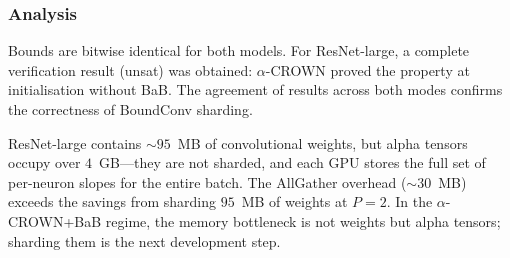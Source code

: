 \subsubsection{Analysis}

Bounds are bitwise identical for both models. For ResNet-large, a complete
verification result (unsat) was obtained: $\alpha$-CROWN proved the property
at initialisation without BaB. The agreement of results across both modes
confirms the correctness of BoundConv sharding.

ResNet-large contains ${\sim}95$~MB of convolutional weights, but alpha tensors
occupy over $4$~GB---they are not sharded, and each GPU stores the full set of
per-neuron slopes for the entire batch. The AllGather overhead (${\sim}30$~MB)
exceeds the savings from sharding $95$~MB of weights at $P=2$. In the
$\alpha$-CROWN+BaB regime, the memory bottleneck is not weights but alpha
tensors; sharding them is the next development step.
